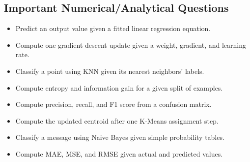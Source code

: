 \documentclass[11pt,a4paper]{article}
\begin{document}
\subsection{Important Numerical/Analytical Questions}
\begin{itemize}[leftmargin=*]
  \item Predict an output value given a fitted linear regression equation.
  \item Compute one gradient descent update given a weight, gradient, and learning rate.
  \item Classify a point using KNN given its nearest neighbors' labels.
  \item Compute entropy and information gain for a given split of examples.
  \item Compute precision, recall, and F1 score from a confusion matrix.
  \item Compute the updated centroid after one K-Means assignment step.
  \item Classify a message using Naive Bayes given simple probability tables.
  \item Compute MAE, MSE, and RMSE given actual and predicted values.
\end{itemize}
\end{document}
